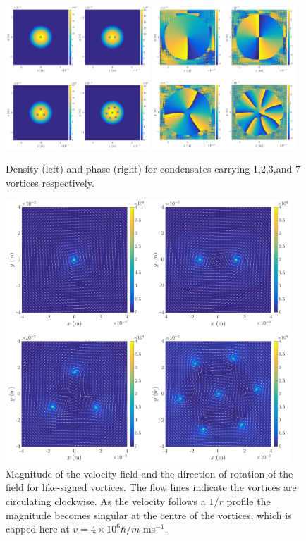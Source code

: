 \begin{figure}\centering
    \includegraphics[width=0.48\textwidth]{Images/ch4_vtx/fewvortex_rho.pdf}
    \includegraphics[width=0.48\textwidth]{Images/ch4_vtx/fewvortex_theta.pdf}
    \caption{Density (left) and phase (right) for condensates carrying 1,2,3,and 7 vortices respectively.}
    \label{fig:few_rho}
\end{figure}

\begin{figure}\centering
    \includegraphics[width=0.95\textwidth]{Images/ch4_vtx/velocity.pdf}
    \caption{Magnitude of the velocity field and the direction of rotation of the field for like-signed vortices. The flow lines indicate the vortices are circulating clockwise. As the velocity follows a $1/r$ profile the magnitude becomes singular at the centre of the vortices, which is capped here at $v=4\times 10^{6} \hbar/m$ ms$^{-1}$.}
    \label{fig:vel_field}
\end{figure}

